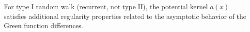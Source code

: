 For type I random walk (recurrent, not type II), the potential kernel \(a(x)\) satisfies additional regularity properties related to the asymptotic behavior of the Green function differences.

